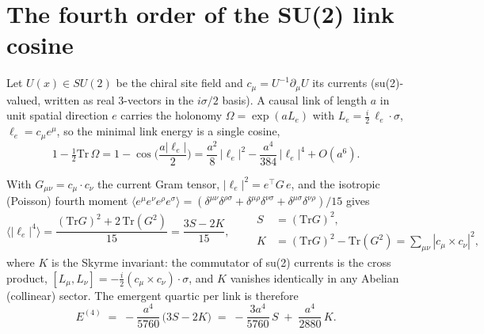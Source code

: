 \section*{The fourth order of the SU(2) link cosine}

Let $U(x)\in SU(2)$ be the chiral site field and
$c_\mu = U^{-1}\partial_\mu U$ its currents (su(2)-valued, written as real
3-vectors in the $i\sigma/2$ basis). A causal link of length $a$ in unit spatial
direction $e$ carries the holonomy $\Omega = \exp(a L_e)$ with
$L_e = \tfrac{i}{2}\,\ell_e\!\cdot\!\sigma$, $\ell_e = c_\mu e^\mu$, so the
minimal link energy is a single cosine,
\begin{equation}
1-\tfrac12\mathrm{Tr}\,\Omega
 = 1-\cos\Big(\frac{a|\ell_e|}{2}\Big)
 = \frac{a^2}{8}\,|\ell_e|^2 - \frac{a^4}{384}\,|\ell_e|^4 + O(a^6).
\end{equation}

With $G_{\mu\nu}=c_\mu\!\cdot\!c_\nu$ the current Gram tensor,
$|\ell_e|^2 = e^\top G\,e$, and the isotropic (Poisson) fourth moment
$\langle e^\mu e^\nu e^\rho e^\sigma\rangle =
(\delta^{\mu\nu}\delta^{\rho\sigma}+\delta^{\mu\rho}\delta^{\nu\sigma}
+\delta^{\mu\sigma}\delta^{\nu\rho})/15$ gives
\begin{equation}
\big\langle |\ell_e|^4 \big\rangle
 = \frac{(\mathrm{Tr}G)^2 + 2\,\mathrm{Tr}(G^2)}{15}
 = \frac{3S-2K}{15},
\qquad
\begin{aligned}
S &= (\mathrm{Tr}G)^2,\\
K &= (\mathrm{Tr}G)^2 - \mathrm{Tr}(G^2)
   = \textstyle\sum_{\mu\nu} |c_\mu\times c_\nu|^2 ,
\end{aligned}
\end{equation}
where $K$ is the Skyrme invariant: the commutator of su(2) currents is the cross
product, $[L_\mu,L_\nu] = -\tfrac{i}{2}(c_\mu\times c_\nu)\!\cdot\!\sigma$, and
$K$ vanishes identically in any Abelian (collinear) sector. The emergent quartic
per link is therefore
\begin{equation}
E^{(4)} \;=\; -\frac{a^4}{5760}\,\big(3S - 2K\big)
\;=\; -\frac{3a^4}{5760}\,S \;+\; \frac{a^4}{2880}\,K .
\label{eq:emergent}
\end{equation}

